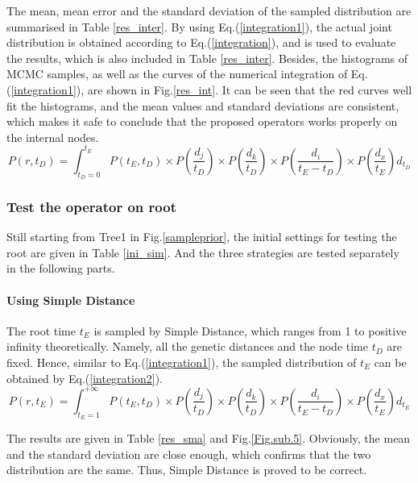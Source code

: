 \documentclass{bmcart}
\begin{document}
The mean, mean error and the standard deviation of the sampled distribution are summarised in Table \ref{res_inter}. By using Eq.(\ref{integration1}), the actual joint distribution is obtained according to Eq.(\ref{integration}), and is used to evaluate the results, which is also included in Table \ref{res_inter}. Besides, the histograms of MCMC samples, as well as the curves of the numerical integration of Eq.(\ref{integration1}), are shown in Fig.\ref{res_int}. It can be seen that the red curves well fit the histograms, and the mean values and standard deviations are consistent, which makes it safe to conclude that the proposed operators works properly on the internal nodes.
\begin{equation}
\label{integration1}
P(r,{t_D}) = \int_{{t_D} = 0}^{{t_E}} {P({t_E},{t_D}) \times P(\frac{{{d_j}}}{{{t_D}}}) \times P(\frac{{{d_k}}}{{{t_D}}}) \times P(\frac{{{d_i}}}{{{t_E} - {t_D}}}) \times P(\frac{{{d_x}}}{{{t_E}}}){d_{t_D}}} 
\end{equation}
\subsubsection*{Test the operator on root}
Still starting from Tree1 in Fig.\ref{sampleprior}, the initial settings for testing the root are given in Table \ref{ini_sim}. And the three strategies are tested separately in the following parts.

\paragraph*{Using Simple Distance}

The root time $t_E$ is sampled by Simple Distance, which ranges from 1 to positive infinity theoretically. Namely, all the genetic distances and the node time $t_D$  are fixed. Hence, similar to Eq.(\ref{integration1}), the sampled distribution of $t_E$ can be obtained by Eq.(\ref{integration2}).
\begin{equation}
\label{integration2}
P(r,{t_E}) = \int_{{t_E} = 1}^{ + \infty } {P({t_E},{t_D}) \times P(\frac{{{d_j}}}{{{t_D}}}) \times P(\frac{{{d_k}}}{{{t_D}}}) \times P(\frac{{{d_i}}}{{{t_E} - {t_D}}}) \times P(\frac{{{d_x}}}{{{t_E}}}){d_{t_E}}} 
\end{equation}

The results are given in Table \ref{res_sma} and Fig.\ref{Fig.sub.5}. Obviously, the mean and the standard deviation are close enough, which confirms that the two distribution are the same. Thus, Simple Distance is proved to be correct.
\end{document}
